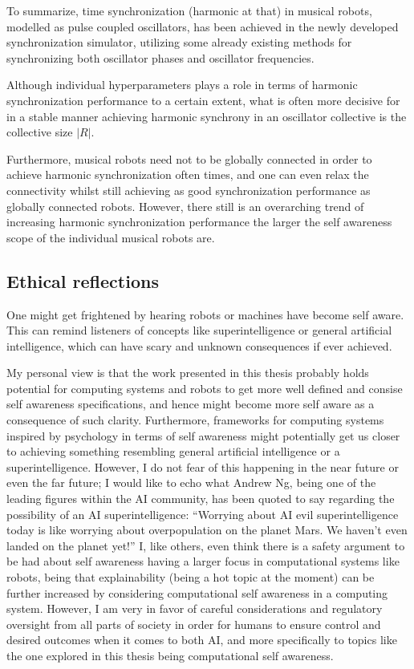 	To summarize, time synchronization (harmonic at that) in musical robots, modelled as pulse coupled oscillators, has been achieved in the newly developed synchronization simulator, utilizing some already existing methods for synchronizing both oscillator phases and oscillator frequencies.
	
	Although individual hyperparameters plays a role in terms of harmonic synchronization performance to a certain extent, what is often more decisive for in a stable manner achieving harmonic synchrony in an oscillator collective is the collective size $|R|$.
	
	Furthermore, musical robots need not to be globally connected in order to achieve harmonic synchronization often times, and one can even relax the connectivity whilst still achieving as good synchronization performance as globally connected robots. However, there still is an overarching trend of increasing harmonic synchronization performance the larger the self awareness scope of the individual musical robots are.


	\subsection{Ethical reflections}
	
	One might get frightened by hearing robots or machines have become self aware. This can remind listeners of concepts like superintelligence or general artificial intelligence, which can have scary and unknown consequences if ever achieved.
	
	My personal view is that the work presented in this thesis probably holds potential for computing systems and robots to get more well defined and consise self awareness specifications, and hence might become more self aware as a consequence of such clarity. Furthermore, frameworks for computing systems inspired by psychology in terms of self awareness might potentially get us closer to achieving something resembling general artificial intelligence or a superintelligence. However, I do not fear of this happening in the near future or even the far future; I would like to echo what Andrew Ng, being one of the leading figures within the AI community, has been quoted to say regarding the possibility of an AI superintelligence: ``Worrying about AI evil superintelligence today is like worrying about overpopulation on the planet Mars. We haven’t even landed on the planet yet!'' I, like others, even think there is a safety argument to be had about self awareness having a larger focus in computational systems like robots, being that explainability (being a hot topic at the moment) can be further increased by considering computational self awareness in a computing system. However, I am very in favor of careful considerations and regulatory oversight from all parts of society in order for humans to ensure control and desired outcomes when it comes to both AI, and more specifically to topics like the one explored in this thesis being computational self awareness.


